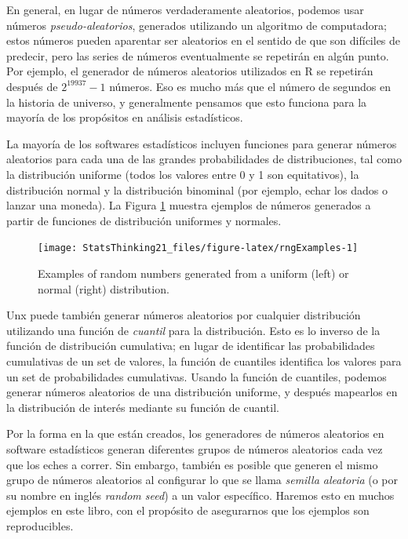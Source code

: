 \documentclass[
  12pt,
]{book}
\begin{document}
En general, en lugar de números verdaderamente aleatorios, podemos usar números \emph{pseudo-aleatorios}, generados utilizando un algoritmo de computadora; estos números pueden aparentar ser aleatorios en el sentido de que son difíciles de predecir, pero las series de números eventualmente se repetirán en algún punto. Por ejemplo, el generador de números aleatorios utilizados en R se repetirán después de \(2^{19937} - 1\) números. Eso es mucho más que el número de segundos en la historia de universo, y generalmente pensamos que esto funciona para la mayoría de los propósitos en análisis estadísticos.

La mayoría de los softwares estadísticos incluyen funciones para generar números aleatorios para cada una de las grandes probabilidades de distribuciones, tal como la distribución uniforme (todos los valores entre 0 y 1 son equitativos), la distribución normal y la distribución binominal (por ejemplo, echar los dados o lanzar una moneda). La Figura \ref{fig:rngExamples} muestra ejemplos de números generados a partir de funciones de distribución uniformes y normales.

\begin{figure}
\texttt{[image: StatsThinking21\_files/figure-latex/rngExamples-1]} \caption{Examples of random numbers generated from a uniform (left) or normal (right) distribution.}\label{fig:rngExamples}
\end{figure}

Unx puede también generar números aleatorios por cualquier distribución utilizando una función de \emph{cuantil} para la distribución. Esto es lo inverso de la función de distribución cumulativa; en lugar de identificar las probabilidades cumulativas de un set de valores, la función de cuantiles identifica los valores para un set de probabilidades cumulativas. Usando la función de cuantiles, podemos generar números aleatorios de una distribución uniforme, y después mapearlos en la distribución de interés mediante su función de cuantil.

Por la forma en la que están creados, los generadores de números aleatorios en software estadísticos generan diferentes grupos de números aleatorios cada vez que los eches a correr. Sin embargo, también es posible que generen el mismo grupo de números aleatorios al configurar lo que se llama \emph{semilla aleatoria} (o por su nombre en inglés \emph{random seed}) a un valor específico. Haremos esto en muchos ejemplos en este libro, con el propósito de asegurarnos que los ejemplos son reproducibles.
\end{document}
